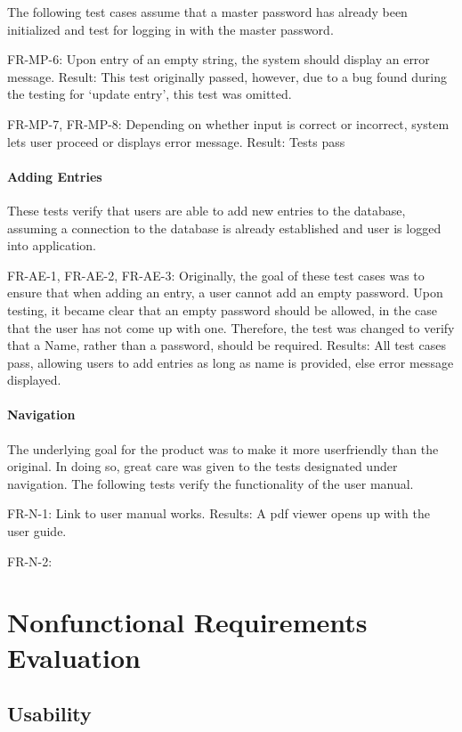 \documentclass[12pt, titlepage]{article}
\begin{document}
	The following test cases assume that a master password has already been initialized and test for logging in with the master password.
	
	FR-MP-6: Upon entry of an empty string, the system should display an error message.
	Result: This test originally passed, however, due to a bug found during the testing for ‘update entry’, this test was omitted. 
	
	FR-MP-7, FR-MP-8: Depending on whether input is correct or incorrect, system lets user proceed or displays error message.
	Result: Tests pass
	
\paragraph{Adding Entries}
These tests verify that users are able to add new entries to the database, assuming a connection to the database is already established and user is logged into application.

	FR-AE-1, FR-AE-2, FR-AE-3: Originally, the goal of these test cases was to ensure that when adding an entry,
	a user cannot add an empty password. Upon testing, it became clear that an empty password should be allowed,
	in the case that the user has not come up with one. Therefore, the test was changed to verify that a Name,
	rather than a password, should be required.
	Results: All test cases pass, allowing users to add entries as long as name is provided, else error message displayed.
	
\paragraph{Navigation}
The underlying goal for the product was to make it more userfriendly than the original. In doing so,
great care was given to the tests designated under navigation. The following tests verify the functionality
of the user manual.

FR-N-1: Link to user manual works.
Results: A pdf viewer opens up with the user guide.

FR-N-2: 

	
	
\section{Nonfunctional Requirements Evaluation}

\subsection{Usability}
		
\end{document}

